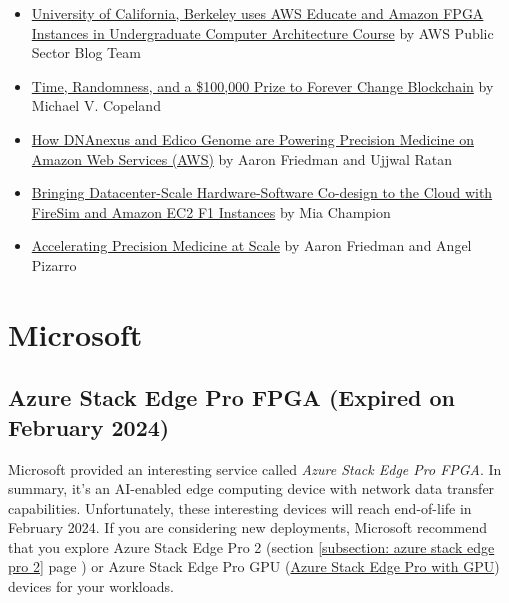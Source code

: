 \documentclass[a4paper]{article}
\begin{document}
    \begin{itemize}
        \item \href{https://aws.amazon.com/blogs/publicsector/university-of-berkeley-uses-aws-educate-for-amazon-fpga-accelerator-development-and-deployment-in-the-cloud/}{University of California, Berkeley uses AWS Educate and Amazon FPGA Instances in Undergraduate Computer Architecture Course} by AWS Public Sector Blog Team

        \item \href{https://aws.amazon.com/blogs/startups/competition-forever-change-blockchain/}{Time, Randomness, and a \$100,000 Prize to Forever Change Blockchain} by Michael V. Copeland

        \item \href{https://aws.amazon.com/blogs/apn/how-dnanexus-and-edico-genome-are-powering-precision-medicine-on-amazon-web-services-aws/}{How DNAnexus and Edico Genome are Powering Precision Medicine on Amazon Web Services (AWS)} by Aaron Friedman and Ujjwal Ratan

        \item \href{https://aws.amazon.com/blogs/compute/bringing-datacenter-scale-hardware-software-co-design-to-the-cloud-with-firesim-and-amazon-ec2-f1-instances/}{Bringing Datacenter-Scale Hardware-Software Co-design to the Cloud with FireSim and Amazon EC2 F1 Instances} by Mia Champion

        \item \href{https://aws.amazon.com/blogs/compute/accelerating-precision-medicine-at-scale/}{Accelerating Precision Medicine at Scale} by Aaron Friedman and Angel Pizarro
    \end{itemize}

    \newpage

    \section{Microsoft}

    \subsection{Azure Stack Edge Pro FPGA (Expired on February 2024)}

    Microsoft provided an interesting service called \emph{Azure Stack Edge Pro FPGA}. In summary, it's an AI-enabled edge computing device with network data transfer capabilities. Unfortunately, these interesting devices will reach end-of-life in February 2024. If you are considering new deployments, Microsoft recommend that you explore Azure Stack Edge Pro 2 (section \ref{subsection: azure stack edge pro 2} page \pageref{subsection: azure stack edge pro 2}) or Azure Stack Edge Pro GPU (\href{https://learn.microsoft.com/en-us/azure/databox-online/azure-stack-edge-gpu-overview}{Azure Stack Edge Pro with GPU}) devices for your workloads.\newline
\end{document}
